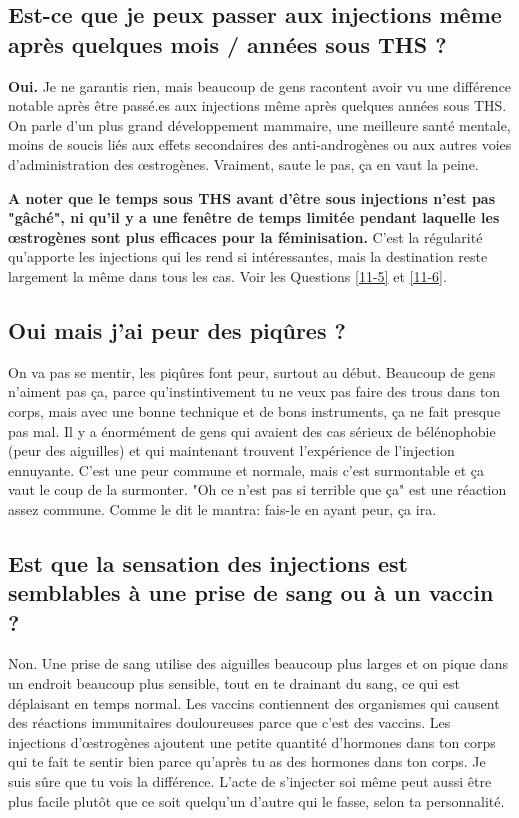 \documentclass{article}
\begin{document}
\subsection{Est-ce que je peux passer aux injections même après quelques mois / années sous THS ?}

\textbf{Oui.} Je ne garantis rien, mais beaucoup de gens racontent avoir vu une différence notable après être passé.es aux injections même après quelques années sous THS. On parle d'un plus grand développement mammaire, une meilleure santé mentale, moins de soucis liés aux effets secondaires des anti-androgènes ou aux autres voies d'administration des œstrogènes. Vraiment, saute le pas, ça en vaut la peine.

\textbf{A noter que le temps sous THS avant d'être sous injections n'est pas "gâché", ni qu'il y a une fenêtre de temps limitée pendant laquelle les œstrogènes sont plus efficaces pour la féminisation.} C'est la régularité qu'apporte les injections qui les rend si intéressantes, mais la destination reste largement la même dans tous les cas. Voir les Questions \ref{11-5} et \ref{11-6}.

\subsection{Oui mais j'ai peur des piqûres ?}

On va pas se mentir, les piqûres font peur, surtout au début. Beaucoup de gens n'aiment pas ça, parce qu'instintivement tu ne veux pas faire des trous dans ton corps, mais avec une bonne technique et de bons instruments, ça ne fait presque pas mal. Il y a énormément de gens qui avaient des cas sérieux de bélénophobie (peur des aiguilles) et qui maintenant trouvent l'expérience de l'injection ennuyante. C'est une peur commune et normale, mais c'est surmontable et ça vaut le coup de la surmonter. "Oh ce n'est pas si terrible que ça" est une réaction assez commune. Comme le dit le mantra: fais-le en ayant peur, ça ira.

\subsection{Est que la sensation des injections est semblables à une prise de sang ou à un vaccin ?}

Non. Une prise de sang utilise des aiguilles beaucoup plus larges et on pique dans un endroit beaucoup plus sensible, tout en te drainant du sang, ce qui est déplaisant en temps normal. Les vaccins contiennent des organismes qui causent des réactions immunitaires douloureuses parce que c'est des vaccins. Les injections d'œstrogènes ajoutent une petite quantité d'hormones dans ton corps qui te fait te sentir bien parce qu'après tu as des hormones dans ton corps. Je suis sûre que tu vois la différence. L'acte de s'injecter soi même peut aussi être plus facile plutôt que ce soit quelqu'un d'autre qui le fasse, selon ta personnalité.
\end{document}
